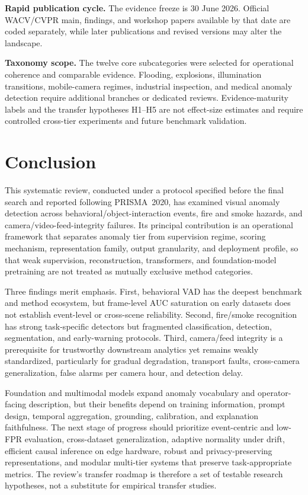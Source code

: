 \documentclass[10pt,a4paper]{article}
\begin{document}
\textbf{Rapid publication cycle.} The evidence freeze is 30 June 2026. Official WACV/CVPR main, findings, and workshop papers available by that date are coded separately, while later publications and revised versions may alter the landscape.

\textbf{Taxonomy scope.} The twelve core subcategories were selected for operational coherence and comparable evidence. Flooding, explosions, illumination transitions, mobile-camera regimes, industrial inspection, and medical anomaly detection require additional branches or dedicated reviews. Evidence-maturity labels and the transfer hypotheses H1--H5 are not effect-size estimates and require controlled cross-tier experiments and future benchmark validation.

\section{Conclusion}
\label{sec:conclusion}

This systematic review, conducted under a protocol specified before the final search and reported following PRISMA~2020, has examined visual anomaly detection across behavioral/object-interaction events, fire and smoke hazards, and camera/video-feed-integrity failures. Its principal contribution is an operational framework that separates anomaly tier from supervision regime, scoring mechanism, representation family, output granularity, and deployment profile, so that weak supervision, reconstruction, transformers, and foundation-model pretraining are not treated as mutually exclusive method categories.

Three findings merit emphasis. First, behavioral VAD has the deepest benchmark and method ecosystem, but frame-level AUC saturation on early datasets does not establish event-level or cross-scene reliability. Second, fire/smoke recognition has strong task-specific detectors but fragmented classification, detection, segmentation, and early-warning protocols. Third, camera/feed integrity is a prerequisite for trustworthy downstream analytics yet remains weakly standardized, particularly for gradual degradation, transport faults, cross-camera generalization, false alarms per camera hour, and detection delay.

Foundation and multimodal models expand anomaly vocabulary and operator-facing description, but their benefits depend on training information, prompt design, temporal aggregation, grounding, calibration, and explanation faithfulness. The next stage of progress should prioritize event-centric and low-FPR evaluation, cross-dataset generalization, adaptive normality under drift, efficient causal inference on edge hardware, robust and privacy-preserving representations, and modular multi-tier systems that preserve task-appropriate metrics. The review's transfer roadmap is therefore a set of testable research hypotheses, not a substitute for empirical transfer studies.
\end{document}
